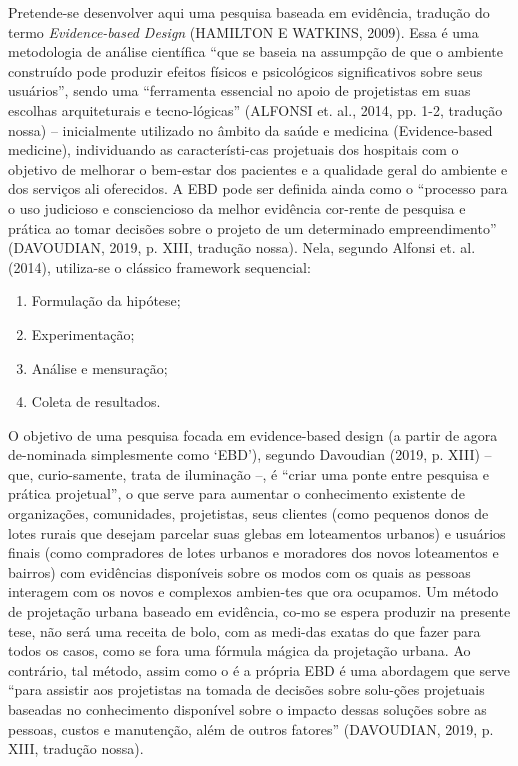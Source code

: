 \documentclass[twoside, 12pt]{book}
\begin{document}
        Pretende-se desenvolver aqui uma pesquisa baseada em evidência, tradução do termo \textit{Evidence-based Design} (HAMILTON E WATKINS, 2009).  Essa é uma metodologia de análise científica “que se baseia na assumpção de que o ambiente construído pode produzir efeitos físicos e psicológicos significativos sobre seus usuários”, sendo uma “ferramenta essencial no apoio de projetistas em suas escolhas arquiteturais e tecno-lógicas” (ALFONSI et. al., 2014, pp. 1-2, tradução nossa)  – inicialmente utilizado no âmbito da saúde e medicina (Evidence-based medicine), individuando as característi-cas projetuais dos hospitais com o objetivo de melhorar o bem-estar dos pacientes e a qualidade geral do ambiente e dos serviços ali oferecidos.  A EBD pode ser definida ainda como o “processo para o uso judicioso e consciencioso da melhor evidência cor-rente de pesquisa e prática ao tomar decisões sobre o projeto de um determinado empreendimento” (DAVOUDIAN, 2019, p. XIII, tradução nossa).  Nela, segundo Alfonsi et. al.  (2014), utiliza-se o clássico framework sequencial:
        \begin{enumerate}[label=\alph*)]
            \item  Formulação da hipótese;
            \item  Experimentação;
            \item  Análise e mensuração;
            \item  Coleta de resultados.
        \end{enumerate}

        O objetivo de uma pesquisa focada em evidence-based design (a partir de agora de-nominada simplesmente como ‘EBD’), segundo Davoudian (2019, p. XIII) – que, curio-samente, trata de iluminação –, é “criar uma ponte entre pesquisa e prática projetual”, o que serve para aumentar o conhecimento existente de organizações, comunidades, projetistas, seus clientes (como pequenos donos de lotes rurais que desejam parcelar suas glebas em loteamentos urbanos) e usuários finais (como compradores de lotes urbanos e moradores dos novos loteamentos e bairros) com evidências disponíveis sobre os modos com os quais as pessoas interagem com os novos e complexos ambien-tes que ora ocupamos. Um método de projetação urbana baseado em evidência,  co-mo se espera produzir na presente tese, não será uma receita de bolo, com as medi-das exatas do que fazer para todos os casos, como se fora uma fórmula mágica da projetação urbana. Ao contrário, tal método, assim como o é a própria EBD é uma abordagem que serve “para assistir aos projetistas na tomada de decisões sobre solu-ções projetuais baseadas no conhecimento disponível sobre o impacto dessas soluções sobre as pessoas, custos e manutenção, além de outros fatores” (DAVOUDIAN, 2019, p. XIII, tradução nossa). 
\end{document}
